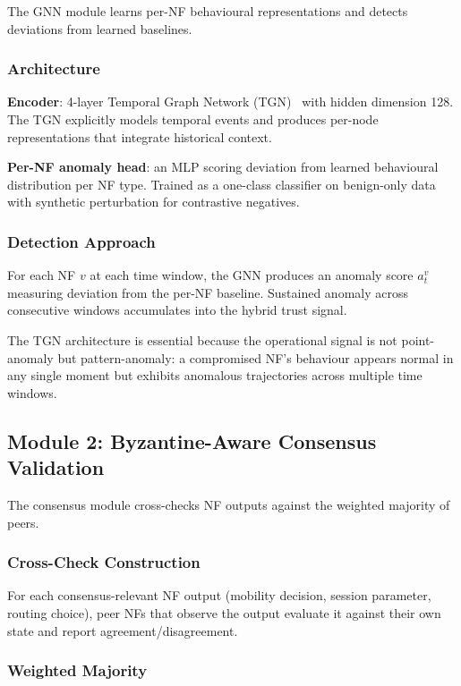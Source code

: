 \documentclass[sigconf,nonacm]{acmart}
\begin{document}
The GNN module learns per-NF behavioural representations and
detects deviations from learned baselines.

\subsubsection{Architecture}

\textbf{Encoder}: 4-layer Temporal Graph Network
(TGN)~\cite{rossi2020tgn} with hidden dimension 128. The TGN
explicitly models temporal events and produces per-node
representations that integrate historical context.

\textbf{Per-NF anomaly head}: an MLP scoring deviation from learned
behavioural distribution per NF type. Trained as a one-class
classifier on benign-only data with synthetic perturbation for
contrastive negatives.

\subsubsection{Detection Approach}

For each NF $v$ at each time window, the GNN produces an anomaly
score $a_t^v$ measuring deviation from the per-NF baseline.
Sustained anomaly across consecutive windows accumulates into the
hybrid trust signal.

The TGN architecture is essential because the operational signal is
not point-anomaly but pattern-anomaly: a compromised NF's behaviour
appears normal in any single moment but exhibits anomalous
trajectories across multiple time windows.

\subsection{Module 2: Byzantine-Aware Consensus Validation}

The consensus module cross-checks NF outputs against the
weighted majority of peers.

\subsubsection{Cross-Check Construction}

For each consensus-relevant NF output (mobility decision,
session parameter, routing choice), peer NFs that observe the
output evaluate it against their own state and report
agreement/disagreement.

\subsubsection{Weighted Majority}
\end{document}
